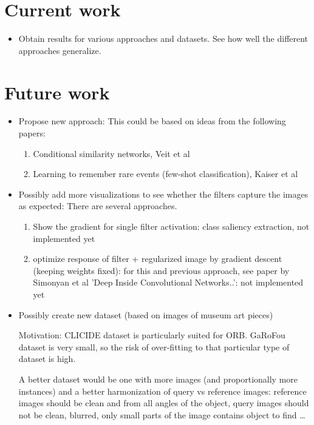 \documentclass[fleqn]{article}
\begin{document}
\section{Current work}
\begin{itemize}
    \item Obtain results for various approaches and datasets. See how well
    the different approaches generalize.
\end{itemize}

\section{Future work}
\begin{itemize}
    \item Propose new approach: This could be based on ideas from the
    following papers:
    \begin{enumerate}
        \item Conditional similarity networks,
        Veit et al~\cite{veit_conditional_2017}
        \item Learning to remember rare events (few-shot classification),
        Kaiser et al~\cite{kaiser_learning_2017}
    \end{enumerate}
    \item Possibly add more visualizations to see whether the filters
    capture the images as expected: There are several approaches.
    \begin{enumerate}
        \item Show the gradient for single filter activation:
        class saliency extraction, not implemented yet
        \item optimize response of filter +
        regularized image by gradient descent (keeping weights fixed):
        for this and previous approach, see paper by
        Simonyan et al 'Deep Inside Convolutional Networks..':
        not implemented yet
    \end{enumerate}

    \item Possibly create new dataset
    (based on images of museum art pieces)

    Motivation: CLICIDE dataset is particularly suited for ORB.
    GaRoFou dataset is very small, so the risk of over-fitting
    to that particular type of dataset is high.

    A better dataset would be one with more images
    (and proportionally more instances) and a better harmonization of
    query vs reference images: reference images should be clean and from
    all angles of the object, query images should not be clean, blurred,
    only small parts of the image contains object to find \dots
\end{itemize}
\end{document}
